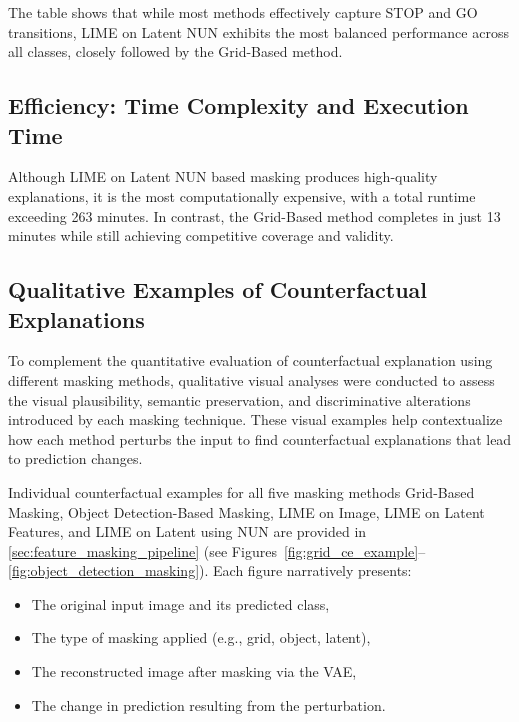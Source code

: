 The table shows that while most methods effectively capture STOP and GO transitions, LIME on Latent NUN exhibits the most balanced performance across all classes, closely followed by the Grid-Based method.




\vspace{1em}


\subsection{Efficiency: Time Complexity and Execution Time}
Although LIME on Latent NUN based masking produces high-quality explanations, it is the most computationally expensive, with a total runtime exceeding 263 minutes. In contrast, the Grid-Based method completes in just 13 minutes while still achieving competitive coverage and validity.



\subsection{Qualitative Examples of Counterfactual Explanations} \label{subsubsec:qualitative_examples}
To complement the quantitative evaluation of counterfactual explanation using different masking methods, qualitative visual analyses were conducted to assess the visual plausibility, semantic preservation, and discriminative alterations introduced by each masking technique. These visual examples help contextualize how each method perturbs the input to find counterfactual explanations that lead to prediction changes.

Individual counterfactual examples for all five masking methods Grid-Based Masking, Object Detection-Based Masking, LIME on Image, LIME on Latent Features, and LIME on Latent using NUN are provided in \cref{sec:feature_masking_pipeline} (see Figures~\ref{fig:grid_ce_example}--\ref{fig:object_detection_masking}). Each figure narratively presents:

\begin{itemize}
    \item The original input image and its predicted class,
    \item The type of masking applied (e.g., grid, object, latent),
    \item The reconstructed image after masking via the VAE,
    \item The change in prediction resulting from the perturbation.
\end{itemize}

